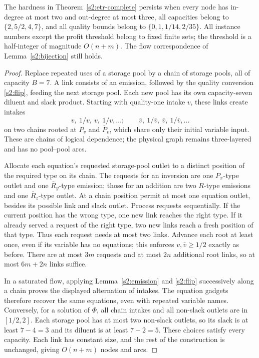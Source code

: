 \begin{theorem}\label{s2:bounded}
The hardness in Theorem~\ref{s2:etr-complete} persists when every node
has in-degree at most two and out-degree at most three, all capacities
belong to $\{2,5/2,4,7\}$, and all quality bounds belong to
$\{0,1,1/14,2/35\}$. All instance numbers except the profit threshold
belong to fixed finite sets; the threshold is a half-integer of
magnitude $O(n+m)$. The flow correspondence of
Lemma~\ref{s2:bijection} still holds.
\end{theorem}
\begin{proof}
Replace repeated uses of a storage pool by a chain of storage pools,
all of capacity $B=7$. A link consists of an emission, followed by the
quality conversion \eqref{s2:flip}, feeding the next storage pool.
Each new pool has its own capacity-seven diluent and slack product.
Starting with quality-one intake $v$, these links create intakes
\[
 v,\ 1/v,\ v,\ 1/v,\ldots;
 \qquad
 \bar v,\ 1/\bar v,\ \bar v,\ 1/\bar v,\ldots
\]
on two chains rooted at $P_v$ and $\bar P_v$, which share only their
initial variable input. These are chains of logical dependence;
the physical graph remains three-layered and has no pool--pool arcs.

Allocate each equation's requested storage-pool outlet to a distinct
position of the required type on its chain. The requests for an
inversion are one $P_x$-type outlet and one $\bar R_y$-type emission;
those for an addition are two $R$-type emissions and one $\bar R_z$-type
outlet. At a chain position permit at most one equation outlet, besides
its possible link and slack outlet. Process requests sequentially.
If the current position has the wrong type, one new link reaches the
right type. If it already served a request of the right type, two new
links reach a fresh position of that type. Thus each request needs at
most two links. Advance each root at least once, even if its variable
has no equations; this enforces $v,\bar v\ge1/2$ exactly as before.
There are at most $3m$ requests and at most $2n$ additional root links,
so at most $6m+2n$ links suffice.

In a saturated flow, applying Lemma~\ref{s2:emission} and
\eqref{s2:flip} successively along a chain proves the displayed
alternation of intakes. The equation gadgets therefore recover the same
equations, even with repeated variable names. Conversely, for a solution
of $\Phi$, all chain intakes and all non-slack outlets are in $[1/2,2]$.
Each storage pool has at most two non-slack outlets, so its slack is at
least $7-4=3$ and its diluent is at least $7-2=5$. These choices satisfy
every capacity. Each link has constant size, and the rest of the
construction is unchanged, giving $O(n+m)$ nodes and arcs.


\end{proof}

